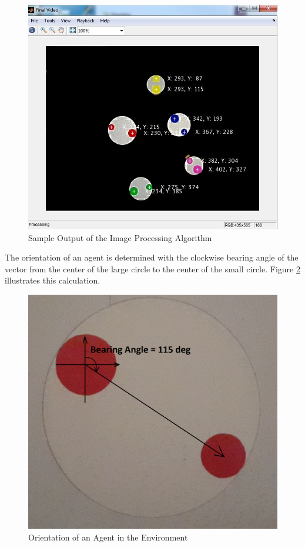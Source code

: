 \begin{figure}[H]
\caption{Sample Output of the Image Processing Algorithm} \label{imageprocess_ref}
\centerline{\includegraphics[scale = 0.50]{Image_Processing}}
\end{figure} 
		
The orientation of an agent is determined with the clockwise bearing angle of the vector from the center of the large circle to the center of the small circle. Figure \ref{bearing_ref} illustrates this calculation.
		
\begin{figure}[H]
\caption{Orientation of an Agent in the Environment} \label{bearing_ref}
\centerline{\includegraphics[scale = 0.20]{Bearing_Angle}}
\end{figure} 
		
